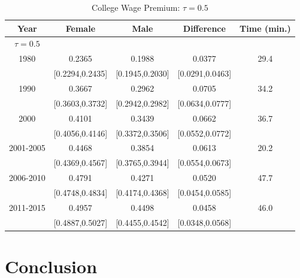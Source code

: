 \documentclass[beamer, t]{beamer}
\begin{document}
\begin{frame}
	
	\begin{table}[htb]
		\centering
		\small
		\caption{College Wage Premium: $\tau=0.5$}\label{tb:median_5yr_full}
		\begin{tabular}{ccccc}
			\hline
			Year & Female & Male & Difference & Time (min.) \\ 
			\hline
			\underline{$\tau = 0.5$}\\
			1980 & 0.2365 & 0.1988 & 0.0377 & 29.4 \\ 
			& [0.2294,0.2435] & [0.1945,0.2030] & [0.0291,0.0463] &  \\ 
			1990 & 0.3667 & 0.2962 & 0.0705 & 34.2 \\ 
			& [0.3603,0.3732] & [0.2942,0.2982] & [0.0634,0.0777] &  \\ 
			2000 & 0.4101 & 0.3439 & 0.0662 & 36.7 \\ 
			& [0.4056,0.4146] & [0.3372,0.3506] & [0.0552,0.0772] &  \\ 
			2001-2005 & 0.4468 & 0.3854 & 0.0613 & 20.2 \\ 
			& [0.4369,0.4567] & [0.3765,0.3944] & [0.0554,0.0673] &  \\ 
			2006-2010 & 0.4791 & 0.4271 & 0.0520 & 47.7 \\ 
			& [0.4748,0.4834] & [0.4174,0.4368] & [0.0454,0.0585] &  \\ 
			2011-2015 & 0.4957 & 0.4498 & 0.0458 & 46.0 \\ 
			& [0.4887,0.5027] & [0.4455,0.4542] & [0.0348,0.0568] &  \\ 
			\hline
		\end{tabular}

	\end{table}
	
	
\end{frame}

\section{Conclusion}
\end{document}
